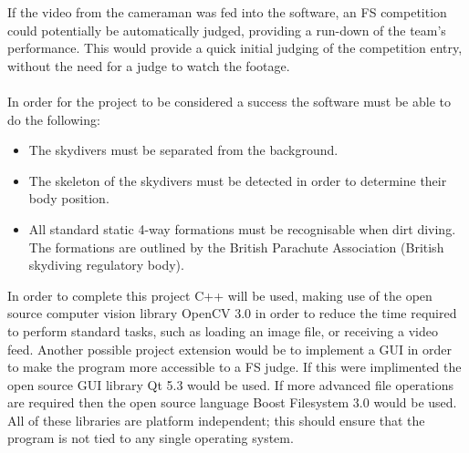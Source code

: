 \documentclass[a4paper, 11pt]{article}
\begin{document}
%
\noindent If the video from the cameraman was fed into the software, an FS competition could potentially be automatically judged, providing a run-down of the team's performance. This would provide a quick initial judging of the competition entry, without the need for a judge to watch the footage.
\\\\
In order for the project to be considered a success the software must be able to do the following:
\begin{itemize}
	\item The skydivers must be separated from the background.
	\item The skeleton of the skydivers must be detected in order to determine their body position.
	\item All standard static 4-way formations must be recognisable when dirt diving. The formations are outlined by the British Parachute Association (British skydiving regulatory body).
\end{itemize}

\noindent In order to complete this project C++ will be used, making use of the open source computer vision library OpenCV 3.0 in order to reduce the time required to perform standard tasks, such as loading an image file, or receiving a video feed.
Another possible project extension would be to implement a GUI in order to make the program more accessible to a FS judge. If this were implimented the open source GUI library Qt 5.3 would be used.
If more advanced file operations are required then the open source language Boost Filesystem 3.0 would be used.
All of these libraries are platform independent; this should ensure that the program is not tied to any single operating system.
\end{document}
